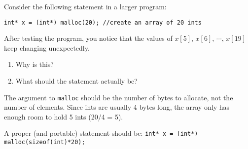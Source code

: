 Consider the following statement in a larger program:

\begin{lstlisting}[numbers=none]
int* x = (int*) malloc(20); //create an array of 20 ints
\end{lstlisting}

After testing the program, you notice that the values of $x[5]$, $x[6]$, $\cdots$, $x[19]$ keep changing unexpectedly.
\begin{enumerate}
\item
Why is this?

\item
What should the statement actually be?

\end{enumerate}

\begin{answer}
The argument to \texttt{malloc} should be the number of bytes to allocate, not the number of elements.
Since ints are usually 4 bytes long, the array only has enough room to hold 5 ints (20/4 = 5).

A proper (and portable) statement should be:
\texttt{int* x = (int*) malloc(sizeof(int)*20);}
\end{answer}
